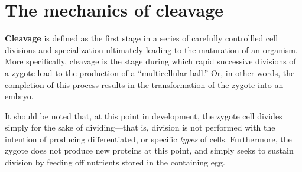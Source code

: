 \documentclass{article}
\begin{document}
\section{The mechanics of cleavage}

\textbf{Cleavage} is defined as the first stage in a series of carefully
controllled cell divisions and specialization ultimately leading to the
maturation of an organism. More specifically, cleavage is the stage
during which rapid successive divisions of a zygote lead to the production
of a ``multicellular ball.'' Or, in other words, the completion of this
process results in the transformation of the zygote into an embryo.

It should be noted that, at this point in development, the zygote cell
divides simply for the sake of dividing---that is, division is not performed
with the intention of producing differentiated, or specific \emph{types}
of cells. Furthermore, the zygote does not produce new proteins at this point,
and simply seeks to sustain division by feeding off nutrients stored in the
containing egg.
\end{document}
